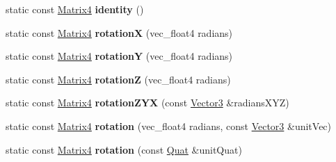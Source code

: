 \begin{DoxyCompactItemize}
\item 
\hypertarget{classVectormath_1_1Soa_1_1Matrix4_ae8e6801090dc8dacaa3d5847a1bd58f5}{static const \hyperlink{classVectormath_1_1Soa_1_1Matrix4}{Matrix4} {\bfseries identity} ()}\label{classVectormath_1_1Soa_1_1Matrix4_ae8e6801090dc8dacaa3d5847a1bd58f5}

\item 
\hypertarget{classVectormath_1_1Soa_1_1Matrix4_a1440ef0a3f0acb0e1d6bef70f8e5308c}{static const \hyperlink{classVectormath_1_1Soa_1_1Matrix4}{Matrix4} {\bfseries rotation\-X} (vec\-\_\-float4 radians)}\label{classVectormath_1_1Soa_1_1Matrix4_a1440ef0a3f0acb0e1d6bef70f8e5308c}

\item 
\hypertarget{classVectormath_1_1Soa_1_1Matrix4_ab0973451cd71d7ef5878367a451d4251}{static const \hyperlink{classVectormath_1_1Soa_1_1Matrix4}{Matrix4} {\bfseries rotation\-Y} (vec\-\_\-float4 radians)}\label{classVectormath_1_1Soa_1_1Matrix4_ab0973451cd71d7ef5878367a451d4251}

\item 
\hypertarget{classVectormath_1_1Soa_1_1Matrix4_a014bab516bf20789c27f7fa1389f4915}{static const \hyperlink{classVectormath_1_1Soa_1_1Matrix4}{Matrix4} {\bfseries rotation\-Z} (vec\-\_\-float4 radians)}\label{classVectormath_1_1Soa_1_1Matrix4_a014bab516bf20789c27f7fa1389f4915}

\item 
\hypertarget{classVectormath_1_1Soa_1_1Matrix4_a50368ae1180a32a91c0b674257b25b78}{static const \hyperlink{classVectormath_1_1Soa_1_1Matrix4}{Matrix4} {\bfseries rotation\-Z\-Y\-X} (const \hyperlink{classVectormath_1_1Soa_1_1Vector3}{Vector3} \&radians\-X\-Y\-Z)}\label{classVectormath_1_1Soa_1_1Matrix4_a50368ae1180a32a91c0b674257b25b78}

\item 
\hypertarget{classVectormath_1_1Soa_1_1Matrix4_a74b5ec73b31e8a399539be6899d0db86}{static const \hyperlink{classVectormath_1_1Soa_1_1Matrix4}{Matrix4} {\bfseries rotation} (vec\-\_\-float4 radians, const \hyperlink{classVectormath_1_1Soa_1_1Vector3}{Vector3} \&unit\-Vec)}\label{classVectormath_1_1Soa_1_1Matrix4_a74b5ec73b31e8a399539be6899d0db86}

\item 
\hypertarget{classVectormath_1_1Soa_1_1Matrix4_a7964b68108da852393b8e2854c990a7f}{static const \hyperlink{classVectormath_1_1Soa_1_1Matrix4}{Matrix4} {\bfseries rotation} (const \hyperlink{classVectormath_1_1Soa_1_1Quat}{Quat} \&unit\-Quat)}\label{classVectormath_1_1Soa_1_1Matrix4_a7964b68108da852393b8e2854c990a7f}


\end{DoxyCompactItemize}
